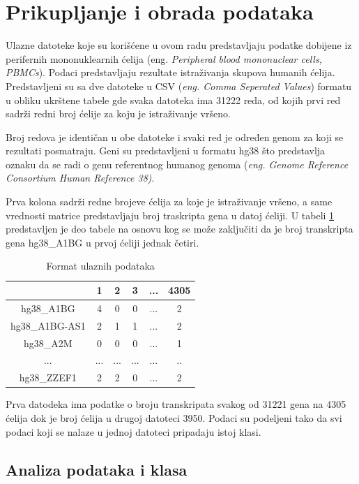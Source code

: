 \documentclass[a4paper]{article}
\begin{document}
\section{Prikupljanje i obrada podataka}
\label{analiza}

Ulazne datoteke koje su korišćene u ovom radu predstavljaju podatke dobijene iz perifernih mononuklearnih ćelija (eng. \textit{Peripheral blood mononuclear cells, PBMCs}). Podaci predstavljaju rezultate istraživanja skupova humanih ćelija. Predstavljeni su sa dve datoteke u CSV (\textit{eng. Comma Seperated Values}) formatu u obliku ukrštene tabele
gde svaka datoteka ima 31222 reda,
od kojih prvi red sadrži redni broj ćelije za koju je istraživanje vršeno.

Broj redova je identičan u obe datoteke i svaki red je određen genom za koji se rezultati posmatraju.
Geni su predstavljeni u formatu hg38 što predstavlja oznaku da se radi o genu referentnog humanog genoma (\textit{eng. Genome Reference Consortium Human Reference 38)}.

Prva kolona sadrži redne brojeve ćelija za koje je istraživanje vršeno, a same vrednosti matrice predstavljaju broj traskripta gena u datoj ćeliji.
U tabeli \ref{table:1} predstavljen je deo tabele na osnovu kog se može zaključiti da je broj transkripta gena hg38\_A1BG u prvoj ćeliji jednak četiri. 
\begin{table}[h!]
\centering
\begin{tabular}{|c c c c c c|} 
 \hline
  & 1 & 2 & 3 & ... & 4305\\ [0.5ex] 
 \hline
 hg38\_A1BG & 4 & 0 & 0 & ... & 2 \\ 
 hg38\_A1BG-AS1 & 2 & 1 & 1 & ... & 2 \\
 hg38\_A2M & 0 & 0 & 0 & ... & 1 \\
 ... & ... & ... & ... & ... & .. \\
 hg38\_ZZEF1 & 2 & 2 & 0 & ... & 2 \\ [1ex] 
 \hline
\end{tabular}
\caption{Format ulaznih podataka}
\label{table:1}
\end{table}

Prva datodeka ima podatke o broju transkripata svakog od 31221 gena na 4305 ćelija dok je broj ćelija u drugoj datoteci 3950. 
Podaci su podeljeni tako da svi podaci koji se nalaze u jednoj datoteci pripadaju istoj klasi. 

\newpage
\subsection{Analiza podataka i klasa}
\end{document}
